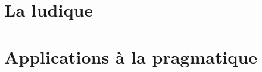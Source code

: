 \documentclass[12pt]{report}
\begin{document}
\chapter{La ludique}

\chapter{Applications à la pragmatique}

\nocite{Tai68}
\nocite{Lec11}
\nocite{Gir03}
\nocite{Gir06}



\end{document}
